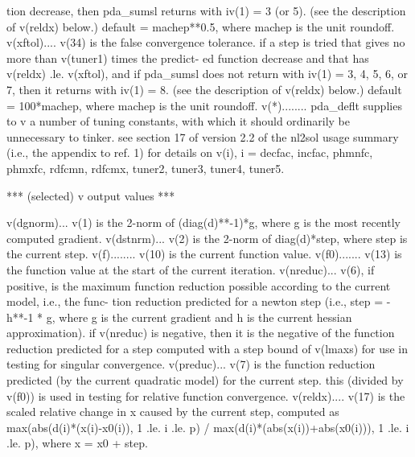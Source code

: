 \documentclass[11pt,twoside,nolof]{starlink}
\begin{document}
\begin{terminalv}
              tion decrease, then pda_sumsl returns with iv(1) = 3 (or 5).
              (see the description of v(reldx) below.)
              default = machep**0.5, where machep is the unit roundoff.
  v(xftol).... v(34) is the false convergence tolerance.  if a step is
              tried that gives no more than v(tuner1) times the predict-
              ed function decrease and that has v(reldx) .le. v(xftol),
              and if pda_sumsl does not return with iv(1) = 3, 4, 5, 6, or
              7, then it returns with iv(1) = 8.  (see the description
              of v(reldx) below.)  default = 100*machep, where
              machep is the unit roundoff.
  v(*)........ pda_deflt supplies to v a number of tuning constants, with
              which it should ordinarily be unnecessary to tinker.  see
              section 17 of version 2.2 of the nl2sol usage summary
              (i.e., the appendix to ref. 1) for details on v(i),
              i = decfac, incfac, phmnfc, phmxfc, rdfcmn, rdfcmx,
              tuner2, tuner3, tuner4, tuner5.

   ***  (selected) v output values  ***

  v(dgnorm)... v(1) is the 2-norm of (diag(d)**-1)*g, where g is the
              most recently computed gradient.
  v(dstnrm)... v(2) is the 2-norm of diag(d)*step, where step is the
              current step.
  v(f)........ v(10) is the current function value.
  v(f0)....... v(13) is the function value at the start of the current
              iteration.
  v(nreduc)... v(6), if positive, is the maximum function reduction
              possible according to the current model, i.e., the func-
              tion reduction predicted for a newton step (i.e.,
              step = -h**-1 * g,  where  g  is the current gradient and
              h is the current hessian approximation).
                   if v(nreduc) is negative, then it is the negative of
              the function reduction predicted for a step computed with
              a step bound of v(lmaxs) for use in testing for singular
              convergence.
  v(preduc)... v(7) is the function reduction predicted (by the current
              quadratic model) for the current step.  this (divided by
              v(f0)) is used in testing for relative function
              convergence.
  v(reldx).... v(17) is the scaled relative change in x caused by the
              current step, computed as
                   max(abs(d(i)*(x(i)-x0(i)), 1 .le. i .le. p) /
                      max(d(i)*(abs(x(i))+abs(x0(i))), 1 .le. i .le. p),
              where x = x0 + step.


\end{terminalv}
\end{document}
